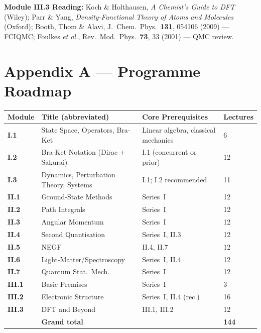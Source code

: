 \documentclass[11pt,a4paper]{article}
\begin{document}
\begin{tcolorbox}[highlightbox]
\textbf{Module III.3 Reading:} Koch \& Holthausen, \textit{A Chemist's Guide to DFT} (Wiley); Parr \& Yang, \textit{Density-Functional Theory of Atoms and Molecules} (Oxford); Booth, Thom \& Alavi, J.\ Chem.\ Phys.\ \textbf{131}, 054106 (2009) --- FCIQMC; Foulkes \textit{et al.}, Rev.\ Mod.\ Phys.\ \textbf{73}, 33 (2001) --- QMC review.
\end{tcolorbox}

\newpage
\section*{Appendix A --- Programme Roadmap}

\begin{center}
\begin{tabular}{@{}llll@{}}
\toprule
\textbf{Module} & \textbf{Title (abbreviated)} & \textbf{Core Prerequisites} & \textbf{Lectures}\\
\midrule
\textbf{I.1} & State Space, Operators, Bra-Ket & Linear algebra, classical mechanics & 6\\
\textbf{I.2} & Bra-Ket Notation (Dirac + Sakurai) & I.1 (concurrent or prior) & 12\\
\textbf{I.3} & Dynamics, Perturbation Theory, Systems & I.1; I.2 recommended & 11\\
\midrule
\textbf{II.1} & Ground-State Methods & Series~I & 12\\
\textbf{II.2} & Path Integrals & Series~I & 12\\
\textbf{II.3} & Angular Momentum & Series~I & 12\\
\textbf{II.4} & Second Quantisation & Series~I, II.3 & 12\\
\textbf{II.5} & NEGF & II.4, II.7 & 12\\
\textbf{II.6} & Light-Matter/Spectroscopy & Series~I, II.4 & 12\\
\textbf{II.7} & Quantum Stat.\ Mech. & Series~I & 12\\
\midrule
\textbf{III.1} & Basic Premises & Series~I & 3\\
\textbf{III.2} & Electronic Structure & Series~I, II.4 (rec.) & 16\\
\textbf{III.3} & DFT and Beyond & III.1, III.2 & 12\\
\midrule
 & \textbf{Grand total} & & \textbf{144}\\
\bottomrule
\end{tabular}
\end{center}
\end{document}
